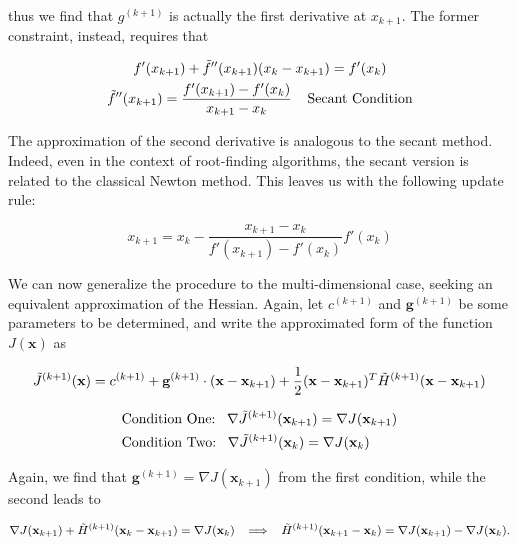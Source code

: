 \documentclass{article}
\numberwithin{equation}{subsection}
\begin{document}
thus we find that $g^{(k+1)}$ is actually the first derivative at $x_{k+1}$. The former constraint, instead, requires that

\begin{gather*}
    f'(x_{k+1}) + \Tilde{f}''(x_{k+1}) (x_k - x_{k+1}) = f'(x_k) \\
    \Tilde{f}''(x_{k+1}) = \frac{f'(x_{k+1}) - f'(x_k)}{x_{k+1}-x_k} \;\;\;\; \text{Secant Condition}
\end{gather*}

The approximation of the second derivative is analogous to the secant method. Indeed, even in the context of root-finding algorithms, the secant version is related to the classical Newton method. This leaves us with the following update rule:

\begin{equation}
    x_{k+1} = x_k - \frac{x_{k+1}-x_k}{f'(x_{k+1}) - f'(x_k)} f'(x_k)
\end{equation}

We can now generalize the procedure to the multi-dimensional case, seeking an equivalent approximation of the Hessian. Again, let $c^{(k+1)}$ and $\textbf{g}^{(k+1)}$ be some parameters to be determined, and write the approximated form of the function $J(\textbf{x})$ as 

\begin{gather*}
    \Tilde{J}^{(k+1)}(\textbf{x}) = c^{(k+1)} + \textbf{g}^{(k+1)}\cdot (\textbf{x} - \textbf{x}_{k+1}) + \frac{1}{2} (\textbf{x} - \textbf{x}_{k+1})^T \Tilde{H}^{(k+1)} (\textbf{x} - \textbf{x}_{k+1})
\end{gather*}

\begin{equation*}
\begin{split}
    &\text{Condition One:} \;\;\; \nabla \Tilde{J}^{(k+1)}(\textbf{x}_{k+1}) = \nabla J(\textbf{x}_{k+1}) \\
    &\text{Condition Two:} \;\;\; \nabla \Tilde{J}^{(k+1)}(\textbf{x}_{k}) = \nabla J(\textbf{x}_{k})
\end{split}
\end{equation*}

Again, we find that $\textbf{g}^{(k+1)} = \nabla J(\textbf{x}_{k+1})$ from the first condition, while the second leads to

\begin{equation*}
    \nabla J(\textbf{x}_{k+1}) + \Tilde{H}^{(k+1)} (\textbf{x}_{k} - \textbf{x}_{k+1}) = \nabla J(\textbf{x}_k) 
    \;\; \implies \;\; 
    \Tilde{H}^{(k+1)}(\textbf{x}_{k+1} - \textbf{x}_k) = \nabla J(\textbf{x}_{k+1}) - \nabla J(\textbf{x}_k).
\end{equation*}
\end{document}
